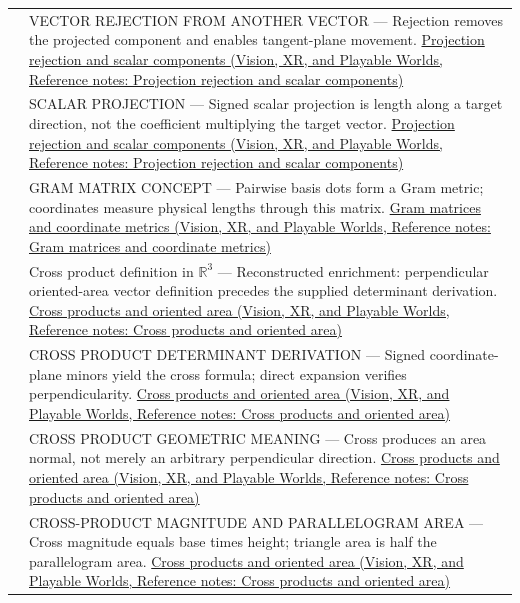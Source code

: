{\begin{longtable}[]{@{}
  >{\raggedright\arraybackslash}p{}
  >{\raggedright\arraybackslash}p{}@{}}
539 & VECTOR REJECTION FROM ANOTHER VECTOR --- Rejection removes the projected component and enables tangent-plane movement. \href{../07-Vision-XR-and-Playable-Worlds/main.pdf\#nameddest=appendix-505a502c372a}{Projection rejection and scalar components (Vision, XR, and Playable Worlds, Reference notes: Projection rejection and scalar components)} \\
540 & SCALAR PROJECTION --- Signed scalar projection is length along a target direction, not the coefficient multiplying the target vector. \href{../07-Vision-XR-and-Playable-Worlds/main.pdf\#nameddest=appendix-505a502c372a}{Projection rejection and scalar components (Vision, XR, and Playable Worlds, Reference notes: Projection rejection and scalar components)} \\
541 & GRAM MATRIX CONCEPT --- Pairwise basis dots form a Gram metric; coordinates measure physical lengths through this matrix. \href{../07-Vision-XR-and-Playable-Worlds/main.pdf\#nameddest=appendix-3b863809f82a}{Gram matrices and coordinate metrics (Vision, XR, and Playable Worlds, Reference notes: Gram matrices and coordinate metrics)} \\
542 & Cross product definition in \(\mathbb R^3\) --- Reconstructed enrichment: perpendicular oriented-area vector definition precedes the supplied determinant derivation. \href{../07-Vision-XR-and-Playable-Worlds/main.pdf\#nameddest=appendix-2391db8052b1}{Cross products and oriented area (Vision, XR, and Playable Worlds, Reference notes: Cross products and oriented area)} \\
543 & CROSS PRODUCT DETERMINANT DERIVATION --- Signed coordinate-plane minors yield the cross formula; direct expansion verifies perpendicularity. \href{../07-Vision-XR-and-Playable-Worlds/main.pdf\#nameddest=appendix-2391db8052b1}{Cross products and oriented area (Vision, XR, and Playable Worlds, Reference notes: Cross products and oriented area)} \\
544 & CROSS PRODUCT GEOMETRIC MEANING --- Cross produces an area normal, not merely an arbitrary perpendicular direction. \href{../07-Vision-XR-and-Playable-Worlds/main.pdf\#nameddest=appendix-2391db8052b1}{Cross products and oriented area (Vision, XR, and Playable Worlds, Reference notes: Cross products and oriented area)} \\
545 & CROSS-PRODUCT MAGNITUDE AND PARALLELOGRAM AREA --- Cross magnitude equals base times height; triangle area is half the parallelogram area. \href{../07-Vision-XR-and-Playable-Worlds/main.pdf\#nameddest=appendix-2391db8052b1}{Cross products and oriented area (Vision, XR, and Playable Worlds, Reference notes: Cross products and oriented area)} \\

\end{longtable}}
